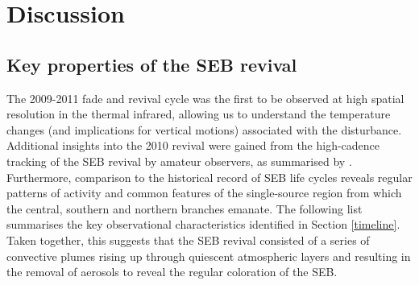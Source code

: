 \documentclass[final,authoryear,5p,times,twocolumn]{elsarticle}
\begin{document}


\section{Discussion}
\label{discuss}

\subsection{Key properties of the SEB revival}

The 2009-2011 fade and revival cycle was the first to be observed at high spatial resolution in the thermal infrared, allowing us to understand the temperature changes (and implications for vertical motions) associated with the disturbance.  Additional insights into the 2010 revival were gained from the high-cadence tracking of the SEB revival by amateur observers, as summarised by \citet{11rogers_21, 11rogers_24, 15rogers, 16rogers}.  Furthermore, comparison to the historical record of SEB life cycles \citep{95rogers, 96sanchez} reveals regular patterns of activity and common features of the single-source region from which the central, southern and northern branches emanate.  The following list summarises the key observational characteristics identified in Section \ref{timeline}.  Taken together, this suggests that the SEB revival consisted of a series of convective plumes rising up through quiescent atmospheric layers and resulting in the removal of aerosols to reveal the regular coloration of the SEB.
\end{document}
